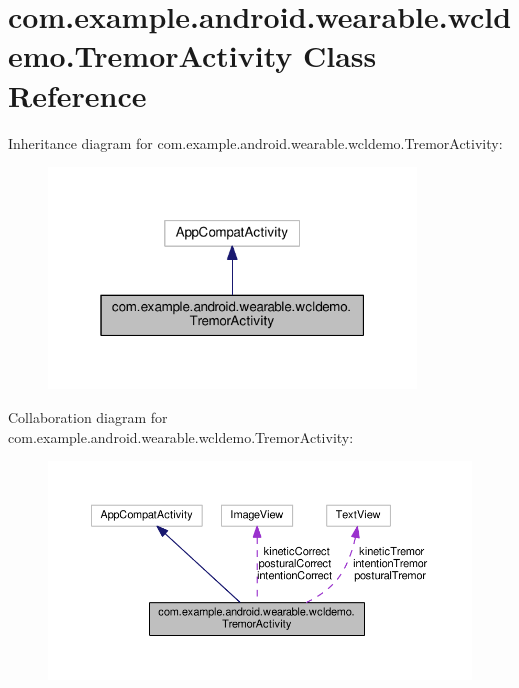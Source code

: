 \hypertarget{classcom_1_1example_1_1android_1_1wearable_1_1wcldemo_1_1TremorActivity}{}\section{com.\+example.\+android.\+wearable.\+wcldemo.\+Tremor\+Activity Class Reference}
\label{classcom_1_1example_1_1android_1_1wearable_1_1wcldemo_1_1TremorActivity}


Inheritance diagram for com.\+example.\+android.\+wearable.\+wcldemo.\+Tremor\+Activity\+:\nopagebreak
\begin{figure}[H]
\begin{center}
\leavevmode
\includegraphics[width=277pt]{d6/dd4/classcom_1_1example_1_1android_1_1wearable_1_1wcldemo_1_1TremorActivity__inherit__graph}
\end{center}
\end{figure}


Collaboration diagram for com.\+example.\+android.\+wearable.\+wcldemo.\+Tremor\+Activity\+:\nopagebreak
\begin{figure}[H]
\begin{center}
\leavevmode
\includegraphics[width=350pt]{dd/dfc/classcom_1_1example_1_1android_1_1wearable_1_1wcldemo_1_1TremorActivity__coll__graph}
\end{center}
\end{figure}
